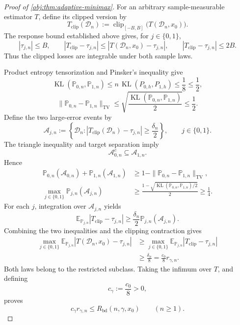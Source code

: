 \begin{proof}[Proof of \cref{obj:thm:adaptive-minimax}]
For an arbitrary sample-measurable estimator \(T\), define its clipped version by
\[
T_{\mathrm{clip}}(\mathcal D_n)
:=
\operatorname{clip}_{[-B,B]}
\bigl(T(\mathcal D_n,x_0)\bigr).
\]
The response bound established above gives, for \(j\in\{0,1\}\),
\[
|\tau_{j,n}|\le B,
\qquad
|T_{\mathrm{clip}}-\tau_{j,n}|
\le |T(\mathcal D_n,x_0)-\tau_{j,n}|,
\qquad
|T_{\mathrm{clip}}-\tau_{j,n}|\le2B.
\]
Thus the clipped losses are integrable under both sample laws.

Product entropy tensorization and Pinsker's inequality give
\[
\operatorname{KL}(\mathbb P_{0,n},\mathbb P_{1,n})
\le n\,\operatorname{KL}(P_{0,h},P_{1,h})
\le\frac18\le\frac12,
\]
\[
\|\mathbb P_{0,n}-\mathbb P_{1,n}\|_{\mathrm{TV}}
\le
\sqrt{\frac{\operatorname{KL}(\mathbb P_{0,n},\mathbb P_{1,n})}{2}}
\le\frac12.
\]
Define the two large-error events by
\[
\mathcal A_{j,n}
:=
\left\{
\mathcal D_n:
|T_{\mathrm{clip}}(\mathcal D_n)-\tau_{j,n}|
\ge\frac{\delta_n}{2}
\right\},
\qquad j\in\{0,1\}.
\]
The triangle inequality and target separation imply
\[
\mathcal A_{0,n}^c\subseteq\mathcal A_{1,n}.
\]
Hence
\[
\begin{aligned}
\mathbb P_{0,n}(\mathcal A_{0,n})
+\mathbb P_{1,n}(\mathcal A_{1,n})
&\ge
1-\|\mathbb P_{0,n}-\mathbb P_{1,n}\|_{\mathrm{TV}},
\\
\max_{j\in\{0,1\}}\mathbb P_{j,n}(\mathcal A_{j,n})
&\ge
\frac{1-
\sqrt{\operatorname{KL}(\mathbb P_{0,n},\mathbb P_{1,n})/2}}{2}
\ge\frac14.
\end{aligned}
\]
For each \(j\), integration over \(\mathcal A_{j,n}\) yields
\[
\mathbb E_{\mathbb P_{j,n}}
|T_{\mathrm{clip}}-\tau_{j,n}|
\ge\frac{\delta_n}{2}\mathbb P_{j,n}(\mathcal A_{j,n}).
\]
Combining the two inequalities and the clipping contraction gives
\[
\begin{aligned}
\max_{j\in\{0,1\}}
\mathbb E_{\mathbb P_{j,n}}
|T(\mathcal D_n,x_0)-\tau_{j,n}|
&\ge
\max_{j\in\{0,1\}}
\mathbb E_{\mathbb P_{j,n}}
|T_{\mathrm{clip}}-\tau_{j,n}|
\\
&\ge\frac{\delta_n}{8}
=\frac{c_0}{8}r_{\gamma,n}.
\end{aligned}
\]
Both laws belong to the restricted subclass. Taking the infimum over \(T\), and defining
\[
c_\gamma:=\frac{c_0}{8}>0,
\]
proves
\[
c_\gamma r_{\gamma,n}
\le R_{\mathrm{bd}}(n,\gamma,x_0)
\qquad(n\ge1).
\]


\end{proof}
